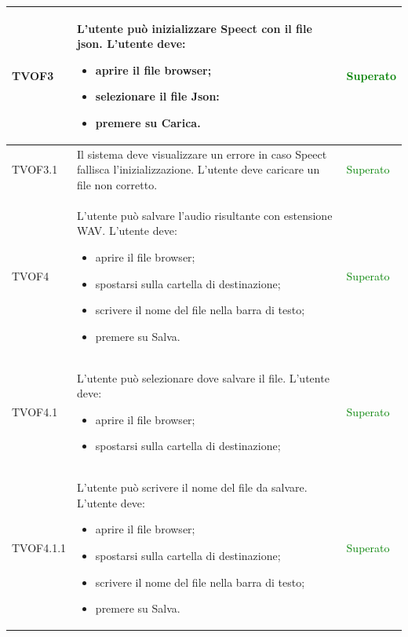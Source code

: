 \documentclass[openany,12pt,a4paper]{report}
\begin{document}
\begin{longtable}[c]{| p{2.5cm} |p{8cm} | p{2.5cm} |}
	\newline TVOF3&		
	\newline L'utente può inizializzare Speect con il file json. L'utente deve:
	\begin{itemize}
		\item aprire il file browser;
		\item selezionare il file Json:
		\item premere su Carica.
	\end{itemize}&
	\newline \textcolor{green}{Superato}
	\\[1em]	
	\hline	
	
	\newline TVOF3.1&
	\newline Il sistema deve visualizzare un errore in caso Speect fallisca l'inizializzazione. L'utente deve caricare un file non corretto.&
	\newline \textcolor{green}{Superato}
	\\[1em]		
	\hline
	
	\newline TVOF4&
	\newline L'utente può salvare l'audio risultante con estensione WAV. L'utente deve:
	\begin{itemize}
		\item aprire il file browser;
		\item spostarsi sulla cartella di destinazione;
		\item scrivere il nome del file nella barra di testo;
		\item premere su Salva.
	\end{itemize}&
	\newline \textcolor{green}{Superato}
	\\[1em]
	\hline
	
	\newline TVOF4.1&
	\newline L'utente può selezionare dove salvare il file. L'utente deve:
	\begin{itemize}
		\item aprire il file browser;
		\item spostarsi sulla cartella di destinazione;
	\end{itemize}&
	\newline \textcolor{green}{Superato}
	\\[1em]
	
	\hline	
	\newline TVOF4.1.1&
	\newline L'utente può scrivere il nome del file da salvare. L'utente deve:
	\begin{itemize}
		\item aprire il file browser;
		\item spostarsi sulla cartella di destinazione;
		\item scrivere il nome del file nella barra di testo;
		\item premere su Salva.
	\end{itemize}&
	\newline \textcolor{green}{Superato}
	\\[1em]
	

\end{longtable}
\end{document}
